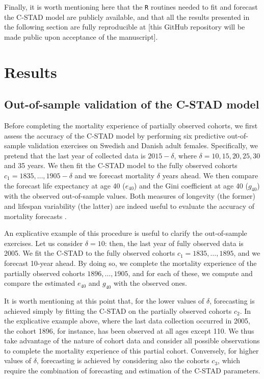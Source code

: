 \documentclass[11pt, a4paper]{article}
\begin{document}
Finally, it is worth mentioning here that the \texttt{R} routines needed to fit and forecast the C-STAD model are publicly available, and that all the results presented in the following section are fully reproducible at [this GitHub repository will be made public upon acceptance of the manuscript]. 

\section{Results}
\label{Sec:Results}

\subsection{Out-of-sample validation of the C-STAD model}
\label{Subsec:Out-of-sample}
Before completing the mortality experience of partially observed cohorts, we first assess the accuracy of the C-STAD model by performing six predictive out-of-sample validation exercises on Swedish and Danish adult females. Specifically, we pretend that the last year of collected data is $2015 - \delta$, where $\delta=10,15,20,25,30$ and 35 years. We then fit the C-STAD model to the fully observed cohorts $c_1=1835,\ldots,1905-\delta$ and we forecast mortality $\delta$ years ahead. We then compare the forecast life expectancy at age 40 ($e_{40}$) and the Gini coefficient at age 40 ($g_{40}$) with the observed out-of-sample values. Both measures of longevity (the former) and lifespan variability (the latter) are indeed useful to evaluate the accuracy of mortality forecasts \citep{bohk2017lifespan}.

An explicative example of this procedure is useful to clarify the out-of-sample exercises. Let us consider $\delta=10$: then, the last year of fully observed data is 2005. We fit the C-STAD to the fully observed cohorts $c_1=1835,\ldots,1895$, and we forecast 10-year ahead. By doing so, we complete the mortality experience of the partially observed cohorts $1896,\ldots,1905$, and for each of these, we compute and compare the estimated $e_{40}$ and $g_{40}$ with the observed ones. 

It is worth mentioning at this point that, for the lower values of $\delta$, forecasting is achieved simply by fitting the C-STAD on the partially observed cohorts $c_2$. In the explicative example above, where the last data collection occurred in 2005, the cohort 1896, for instance, has been observed at all ages except 110. We thus take advantage of the nature of cohort data and consider all possible observations to complete the mortality experience of this partial cohort.  Conversely, for higher values of $\delta$, forecasting is achieved by considering also the cohorts $c_3$, which require the combination of forecasting and estimation of the C-STAD parameters. 
\end{document}
